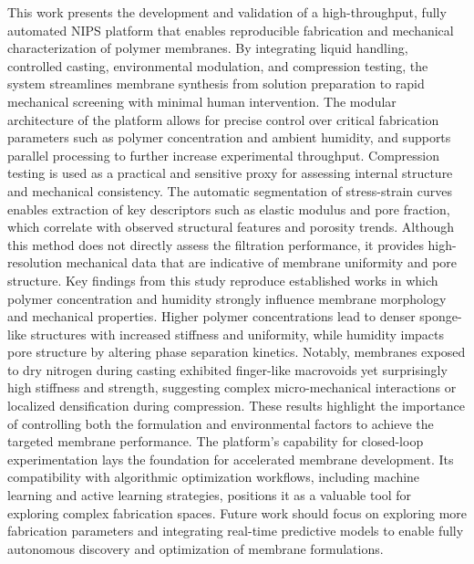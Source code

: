 \documentclass[preprint,12pt,times]{elsarticle}
\begin{document}
This work presents the development and validation of a high-throughput, fully automated NIPS platform that enables reproducible fabrication and mechanical characterization of polymer membranes. By integrating liquid handling, controlled casting, environmental modulation, and compression testing, the system streamlines membrane synthesis from solution preparation to rapid mechanical screening with minimal human intervention. The modular architecture of the platform allows for precise control over critical fabrication parameters such as polymer concentration and ambient humidity, and supports parallel processing to further increase experimental throughput. Compression testing is used as a practical and sensitive proxy for assessing internal structure and mechanical consistency. The automatic segmentation of stress-strain curves enables extraction of key descriptors such as elastic modulus and pore fraction, which correlate with observed structural features and porosity trends. Although this method does not directly assess the filtration performance, it provides high-resolution mechanical data that are indicative of membrane uniformity and pore structure. Key findings from this study reproduce established works in which polymer concentration and humidity strongly influence membrane morphology and mechanical properties. Higher polymer concentrations lead to denser sponge-like structures with increased stiffness and uniformity, while humidity impacts pore structure by altering phase separation kinetics. Notably, membranes exposed to dry nitrogen during casting exhibited finger-like macrovoids yet surprisingly high stiffness and strength, suggesting complex micro-mechanical interactions or localized densification during compression. These results highlight the importance of controlling both the formulation and environmental factors to achieve the targeted membrane performance. The platform's capability for closed-loop experimentation lays the foundation for accelerated membrane development. Its compatibility with algorithmic optimization workflows, including machine learning and active learning strategies, positions it as a valuable tool for exploring complex fabrication spaces. Future work should focus on exploring more fabrication parameters and integrating real-time predictive models to enable fully autonomous discovery and optimization of membrane formulations.
\end{document}
